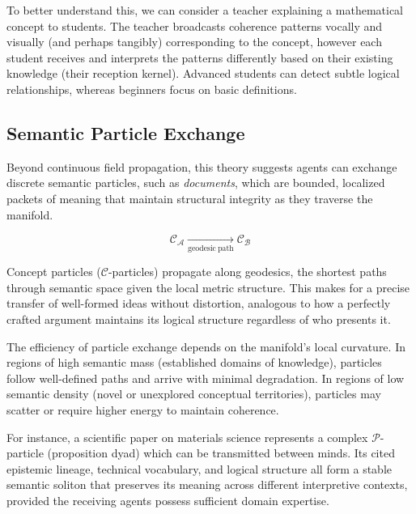 To better understand this, we can consider a teacher explaining a mathematical concept to students. The teacher broadcasts coherence patterns vocally and visually (and perhaps tangibly) corresponding to the concept, however each student receives and interprets the patterns differently based on their existing knowledge (their reception kernel). Advanced students can detect subtle logical relationships, whereas beginners focus on basic definitions.


\subsection{Semantic Particle Exchange}
\label{14.3.2:semantic_particle_exchange}

Beyond continuous field propagation, this theory suggests agents can exchange discrete semantic particles, such as \textit{documents}, which are bounded, localized packets of meaning that maintain structural integrity as they traverse the manifold.

\begin{equation}
\mathcal{C}_{\mathcal{A}} \xrightarrow[\mathrm{geodesic\ path}]{} \mathcal{C}_{\mathcal{B}}
\end{equation}

Concept particles (\(\mathcal{C}\)-particles) propagate along geodesics, the shortest paths through semantic space given the local metric structure. This makes for a precise transfer of well-formed ideas without distortion, analogous to how a perfectly crafted argument maintains its logical structure regardless of who presents it.

The efficiency of particle exchange depends on the manifold's local curvature. In regions of high semantic mass (established domains of knowledge), particles follow well-defined paths and arrive with minimal degradation. In regions of low semantic density (novel or unexplored conceptual territories), particles may scatter or require higher energy to maintain coherence.

For instance, a scientific paper on materials science represents a complex \(\mathcal{P}\)-particle (proposition dyad) which can be transmitted between minds. Its cited epistemic lineage, technical vocabulary, and logical structure all form a stable semantic soliton that preserves its meaning across different interpretive contexts, provided the receiving agents possess sufficient domain expertise.

